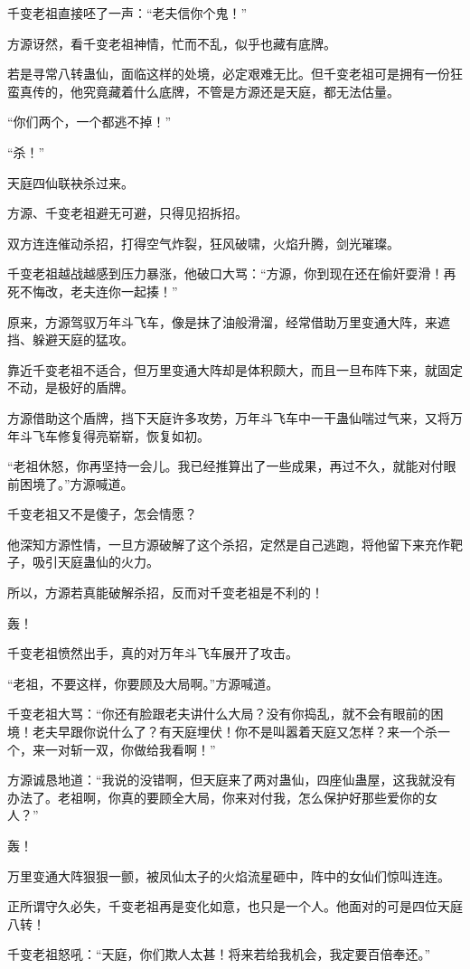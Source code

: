 \begin{this_body}
千变老祖直接呸了一声：“老夫信你个鬼！”

方源讶然，看千变老祖神情，忙而不乱，似乎也藏有底牌。

若是寻常八转蛊仙，面临这样的处境，必定艰难无比。但千变老祖可是拥有一份狂蛮真传的，他究竟藏着什么底牌，不管是方源还是天庭，都无法估量。

“你们两个，一个都逃不掉！”

“杀！”

天庭四仙联袂杀过来。

方源、千变老祖避无可避，只得见招拆招。

双方连连催动杀招，打得空气炸裂，狂风破啸，火焰升腾，剑光璀璨。

千变老祖越战越感到压力暴涨，他破口大骂：“方源，你到现在还在偷奸耍滑！再死不悔改，老夫连你一起揍！”

原来，方源驾驭万年斗飞车，像是抹了油般滑溜，经常借助万里变通大阵，来遮挡、躲避天庭的猛攻。

靠近千变老祖不适合，但万里变通大阵却是体积颇大，而且一旦布阵下来，就固定不动，是极好的盾牌。

方源借助这个盾牌，挡下天庭许多攻势，万年斗飞车中一干蛊仙喘过气来，又将万年斗飞车修复得亮崭崭，恢复如初。

“老祖休怒，你再坚持一会儿。我已经推算出了一些成果，再过不久，就能对付眼前困境了。”方源喊道。

千变老祖又不是傻子，怎会情愿？

他深知方源性情，一旦方源破解了这个杀招，定然是自己逃跑，将他留下来充作靶子，吸引天庭蛊仙的火力。

所以，方源若真能破解杀招，反而对千变老祖是不利的！

轰！

千变老祖愤然出手，真的对万年斗飞车展开了攻击。

“老祖，不要这样，你要顾及大局啊。”方源喊道。

千变老祖大骂：“你还有脸跟老夫讲什么大局？没有你捣乱，就不会有眼前的困境！老夫早跟你说什么了？有天庭埋伏！你不是叫嚣着天庭又怎样？来一个杀一个，来一对斩一双，你做给我看啊！”

方源诚恳地道：“我说的没错啊，但天庭来了两对蛊仙，四座仙蛊屋，这我就没有办法了。老祖啊，你真的要顾全大局，你来对付我，怎么保护好那些爱你的女人？”

轰！

万里变通大阵狠狠一颤，被凤仙太子的火焰流星砸中，阵中的女仙们惊叫连连。

正所谓守久必失，千变老祖再是变化如意，也只是一个人。他面对的可是四位天庭八转！

千变老祖怒吼：“天庭，你们欺人太甚！将来若给我机会，我定要百倍奉还。”


\end{this_body}

